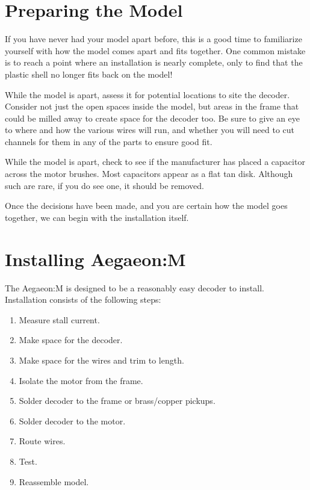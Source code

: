 \documentclass[12pt,letterpaper,draft]{memoir} %
\begin{document}
\section{Preparing the Model}

If you have never had your model apart before, this is a good time to familiarize yourself with how the model comes apart and fits together. One common mistake is to reach a point where an installation is nearly complete, only to find that the plastic shell no longer fits back on the model!

While the model is apart, assess it for potential locations to site the decoder. Consider not just the open spaces inside the model, but areas in the frame that could be milled away to create space for the decoder too. Be sure to give an eye to where and how the various wires will run, and whether you will need to cut channels for them in any of the parts to ensure good fit.

While the model is apart, check to see if the manufacturer has placed a capacitor across the motor brushes. Most capacitors appear as a flat tan disk. Although such are rare, if you do see one, it should be removed.

Once the decisions have been made, and you are certain how the model goes together, we can begin with the installation itself.

\section{Installing Aegaeon:M}

The Aegaeon:M is designed to be a reasonably easy decoder to install. Installation consists of the following steps:
\begin{enumerate}
\item Measure stall current.
\item Make space for the decoder.
\item Make space for the wires and trim to length.
\item Isolate the motor from the frame.
\item Solder decoder to the frame or brass/copper pickups.
\item Solder decoder to the motor.
\item Route wires.
\item Test.
\item Reassemble model.
\end{enumerate}
\end{document}
